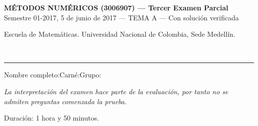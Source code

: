 \documentclass[11pt]{article}
\newcommand{\examheader}{%
  \noindent
  \begin{minipage}[t]{0.6\linewidth}
    {\small\bfseries MÉTODOS NUMÉRICOS (3006907) --- Tercer Examen Parcial}\\
    {\small Semestre 01-2017, 5 de junio de 2017 --- TEMA A --- Con solución verificada}
  \end{minipage}%
  \hfill
  \begin{minipage}[t]{0.35\linewidth}
    \raggedleft\small Escuela de Matemáticas. Universidad Nacional de Colombia, Sede Medellín.
  \end{minipage}\\[2pt]
  \rule{\linewidth}{0.6pt}
}
\begin{document}
\examheader

\vspace{4pt}
\noindent Nombre completo:\underline{\hspace{7.5cm}}\quad Carné:\underline{\hspace{2.5cm}}\quad Grupo:\underline{\hspace{1.5cm}}

\vspace{6pt}
\noindent\textit{La interpretación del examen hace parte de la evaluación, por tanto no se admiten preguntas comenzada la prueba.}

\vspace{6pt}
\noindent{}

\vspace{4pt}
\noindent Duración: 1 hora y 50 minutos.

\vspace{10pt}
\end{document}
